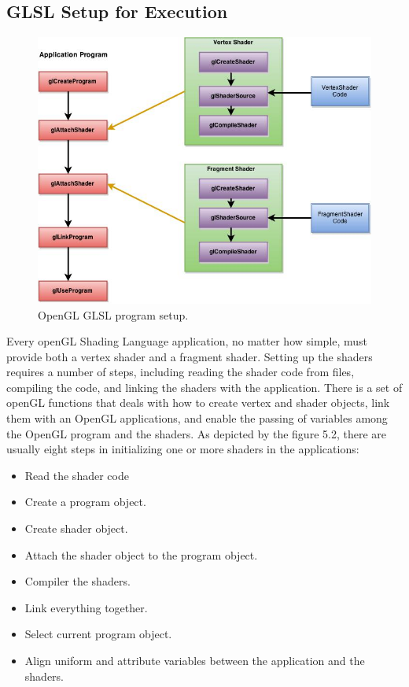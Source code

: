 \subsection{GLSL Setup for Execution}

\begin{figure}
\centering
\includegraphics[width=450pt]{Images/glsl_setup.jpg}
\caption{\label{fig:ray_cast1.jpg} OpenGL GLSL program setup.}
\end{figure}
 
Every openGL Shading Language application, no matter how simple, must provide both a vertex shader and a fragment shader. Setting up the shaders requires a number of steps, including reading the shader code from files, compiling the code, and linking the shaders with the application. There is a set of openGL functions that deals with how to create vertex and shader objects, link them with an OpenGL applications, and enable the passing of variables among the OpenGL program and the shaders. As depicted by the figure 5.2, there are usually eight steps in initializing one or more shaders in the applications:

\begin{itemize}
\item Read the shader code
\item Create a program object.
\item Create shader object.
\item Attach the shader object to the program object.
\item Compiler the shaders.
\item Link everything together.
\item Select current program object.
\item Align uniform and attribute variables between the application and the shaders.
\end{itemize}

